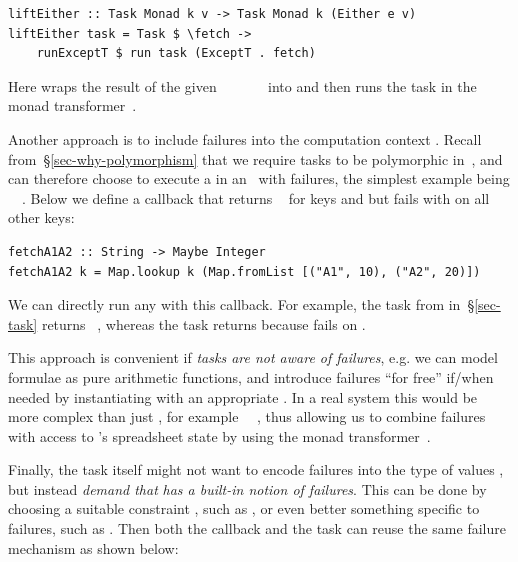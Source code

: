 \vspace{1mm}
\begin{verbatim}
liftEither :: Task Monad k v -> Task Monad k (Either e v)
liftEither task = Task $ \fetch ->
    runExceptT $ run task (ExceptT . fetch)
\end{verbatim}
\vspace{1mm}

\noindent
Here  wraps the result of the given
~\hs{::}~~\hs{->}~~~ into 
and then runs the task in the  monad
transformer~\cite{liang1995monad}.

Another approach is to include failures into the computation context .
Recall from~\S\ref{sec-why-polymorphism} that we require tasks to be polymorphic
in~, and can therefore choose to execute a  in an~ with
failures, the simplest example being ~\hs{=}~. Below we define
a callback that returns ~ for keys  and  but
fails with  on all other keys:

\vspace{1mm}
\begin{verbatim}
fetchA1A2 :: String -> Maybe Integer
fetchA1A2 k = Map.lookup k (Map.fromList [("A1", 10), ("A2", 20)])
\end{verbatim}
\vspace{1mm}

\noindent
We can directly run any  with this callback. For example, the task
 from  in~\S\ref{sec-task} returns
~, whereas the task  returns 
because  fails on .

This approach is convenient if \emph{tasks are not aware of failures}, e.g. we
can model \Excel formulae as pure arithmetic functions, and introduce failures
``for free'' if/when needed by instantiating  with an appropriate
. In a real system this  would be more complex than just ,
for example ~~, thus allowing us to
combine failures with access to \Excel's spreadsheet state by using the
 monad transformer~\cite{liang1995monad}.

Finally, the task itself might not want to encode failures into the type of
values , but instead \emph{demand that}  \emph{has a built-in notion
of failures}. This can be done by choosing a suitable constraint , such as
,  or even better something specific to failures,
such as . Then both the callback and the task can reuse the same
failure mechanism as shown below:

